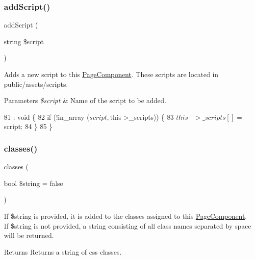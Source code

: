 \subsubsection{\texorpdfstring{add\+Script()}{addScript()}}
{\footnotesize\ttfamily add\+Script (\begin{DoxyParamCaption}\item[{string}]{\$script }\end{DoxyParamCaption})}

Adds a new script to this \hyperlink{class_lora_1_1_page_component}{Page\+Component}. These scripts are located in public/assets/scripts. 
\begin{DoxyParams}{Parameters}
{\em \$script} & Name of the script to be added. \\
\hline
\end{DoxyParams}

\begin{DoxyCode}
81                                                : \textcolor{keywordtype}{void} \{
82         \textcolor{keywordflow}{if} (!in\_array ($script, $this->\_scripts)) \{
83             $this->\_scripts [] = $script;
84         \}
85     \}
\end{DoxyCode}
\mbox{\label{class_lora_1_1_page_component_af6ac36c4e10b38c61aa0b45fa736bfc4}} 
\subsubsection{\texorpdfstring{classes()}{classes()}}
{\footnotesize\ttfamily classes (\begin{DoxyParamCaption}\item[{bool}]{\$string = {\ttfamily false} }\end{DoxyParamCaption})}

If \$string is provided, it is added to the classes assigned to this \hyperlink{class_lora_1_1_page_component}{Page\+Component}. If \$string is not provided, a string consisting of all class names separated by space will be returned. \begin{DoxyReturn}{Returns}
Returns a string of css classes. 
\end{DoxyReturn}

